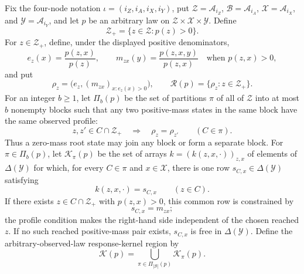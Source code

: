 Fix the four-node notation \(\iota=(i_Z,i_A,i_X,i_Y)\), put
\(\mathcal Z=\mathcal A_{i_Z}\), \(\mathcal B=\mathcal A_{i_A}\),
\(\mathcal X=\mathcal A_{i_X}\), and
\(\mathcal Y=\mathcal A_{i_Y}\), and let \(p\) be an arbitrary law on
\(\mathcal Z\times\mathcal X\times\mathcal Y\).  Define
\[
 \mathcal Z_+=\{z\in\mathcal Z:p(z)>0\}.
\]
For \(z\in\mathcal Z_+\), define, under the displayed positive
denominators,
\[
 e_z(x)=\frac{p(z,x)}{p(z)},
 \qquad
 m_{zx}(y)=\frac{p(z,x,y)}{p(z,x)}\quad\text{when }p(z,x)>0,
\]
and put
\[
 \rho_z=\bigl(e_z,(m_{zx})_{x:e_z(x)>0}\bigr),
 \qquad
 \mathcal R(p)=\{\rho_z:z\in\mathcal Z_+\}.
\]
For an integer \(b\geq1\), let \(\Pi_b(p)\) be the set of partitions
\(\pi\) of all of \(\mathcal Z\) into at most \(b\) nonempty blocks
such that any two positive-mass states in the same block have the same
observed profile:
\[
 z,z'\in C\cap\mathcal Z_+\quad\Longrightarrow\quad \rho_z=\rho_{z'}
 \qquad(C\in\pi).
\]
Thus a zero-mass root state may join any block or form a separate block.
For \(\pi\in\Pi_b(p)\), let \(\mathcal K_\pi(p)\) be the set of arrays
\(k=(k(z,x,\cdot))_{z,x}\) of elements of \(\Delta(\mathcal Y)\) for
which, for every \(C\in\pi\) and \(x\in\mathcal X\), there is one row
\(s_{C,x}\in\Delta(\mathcal Y)\) satisfying
\[
 k(z,x,\cdot)=s_{C,x}\qquad(z\in C).
\]
If there exists \(z\in C\cap\mathcal Z_+\) with \(p(z,x)>0\), this
common row is constrained by
\[
 s_{C,x}=m_{zx};
\]
the profile condition makes the right-hand side independent of the
chosen reached \(z\).  If no such reached positive-mass pair exists,
\(s_{C,x}\) is free in \(\Delta(\mathcal Y)\).  Define the
arbitrary-observed-law response-kernel region by
\[
 \mathcal K(p)=
 \bigcup_{\pi\in\Pi_{|\mathcal B|}(p)}\mathcal K_\pi(p).
\]
